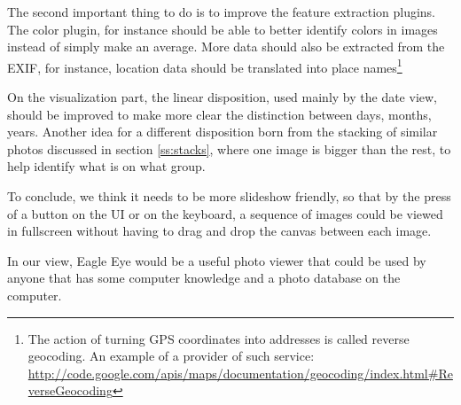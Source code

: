 The second important thing to do is to improve the feature extraction plugins. The color plugin, for instance should be able to better identify colors in images instead of simply make an average. More data should also be extracted from the EXIF, for instance, location data should be translated into place names\footnote{The action of turning GPS coordinates into addresses is called reverse geocoding. An example of a provider of such service: \url{http://code.google.com/apis/maps/documentation/geocoding/index.html\#ReverseGeocoding}}

On the visualization part, the linear disposition, used mainly by the date view, should be improved to make more clear the distinction between days, months, years. Another idea for a different disposition born from the stacking of similar photos discussed in section \ref{ss:stacks}, where one image is bigger than the rest, to help identify what is on what group.

To conclude, we think it needs to be more slideshow friendly, so that by the press of a button on the \ac{UI} or on the keyboard, a sequence of images could be viewed in fullscreen without having to drag and drop the canvas between each image. 

In our view, Eagle Eye would be a useful photo viewer that could be used by anyone that has some computer knowledge and a photo database on the computer.

\cleardoublepage

